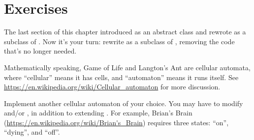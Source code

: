 \section{Exercises}

\begin{exercise}

The last section of this chapter introduced  as an abstract class and rewrote  as a subclass of .
Now it's your turn: rewrite  as a subclass of , removing the code that's no longer needed.

\end{exercise}


\begin{exercise}

Mathematically speaking, Game of Life and Langton's Ant are cellular automata, where ``cellular'' means it has cells, and ``automaton'' means it runs itself.
See \url{https://en.wikipedia.org/wiki/Cellular_automaton} for more discussion.

Implement another cellular automaton of your choice.
You may have to modify  and/or , in addition to extending .
For example, Brian's Brain (\url{https://en.wikipedia.org/wiki/Brian's_Brain}) requires three states: ``on'', ``dying'', and ``off''.

\end{exercise}

